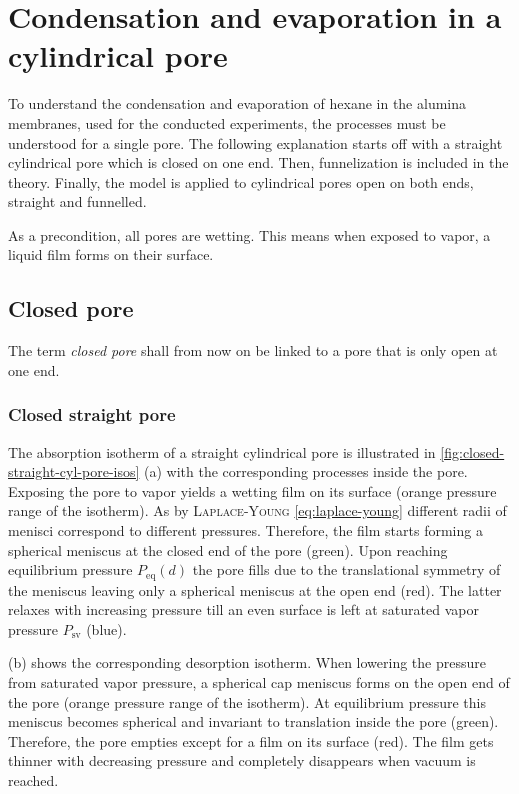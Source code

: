 \documentclass[../thesis.tex]{subfiles}
\begin{document}
    \section{Condensation and evaporation in a cylindrical pore}

        To understand the condensation and evaporation of hexane in the alumina membranes, used for the conducted experiments, the processes must be understood for a single pore. The following explanation starts off with a straight cylindrical pore which is closed on one end. Then, funnelization is included in the theory. Finally, the model is applied to cylindrical pores open on both ends, straight and funnelled.
        \medskip

        As a precondition, all pores are wetting. This means when exposed to vapor, a liquid film forms on their surface.


        \subsection{Closed pore}

            The term \textit{closed pore} shall from now on be linked to a pore that is only open at one end.

            \subsubsection{Closed straight pore}

                The absorption isotherm of a straight cylindrical pore is illustrated in \cref{fig:closed-straight-cyl-pore-isos} (a) with the corresponding processes inside the pore. Exposing the pore to vapor yields a wetting film on its surface (orange pressure range of the isotherm). As by \textsc{Laplace-Young} \cref{eq:laplace-young} different radii of menisci correspond to different pressures. Therefore, the film starts forming a spherical meniscus at the closed end of the pore (green). Upon reaching equilibrium pressure $P_\mathrm{eq}(d)$ the pore fills due to the translational symmetry of the meniscus leaving only a spherical meniscus at the open end (red). The latter relaxes with increasing pressure till an even surface is left at saturated vapor pressure $P_\mathrm{sv}$ (blue).
                \medskip

                 (b) shows the corresponding desorption isotherm. When lowering the pressure from saturated vapor pressure, a spherical cap meniscus forms on the open end of the pore (orange pressure range of the isotherm). At equilibrium pressure this meniscus becomes spherical and invariant to translation inside the pore (green). Therefore, the pore empties except for a film on its surface (red). The film gets thinner with decreasing pressure and completely disappears when vacuum is reached.
\end{document}
